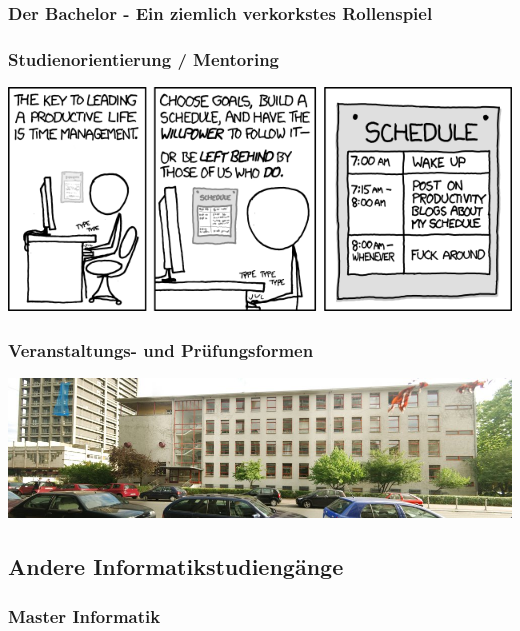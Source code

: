 \documentclass[12pt,a4paper]{scrartcl}
\newcommand{\spaltenanfang}{\begin{multicols}{2}}
\newcommand{\spaltenende}{\end{multicols}}
\begin{document}
\subsubsection{Der Bachelor - Ein ziemlich verkorkstes Rollenspiel}
\spaltenanfang

\spaltenende
\newpage
\subsubsection{Studienorientierung / Mentoring}

\begin{center}
	\includegraphics[scale=0.8]{comics/time_management.png}
\end{center}
\newpage
\subsubsection{Veranstaltungs- und Prüfungsformen}



	\begin{center}
		\includegraphics[scale=1.0]{bilder/rm_pano}
	\end{center}
\subsection{Andere Informatikstudiengänge}
	\subsubsection{Master Informatik}
	
\end{document}

